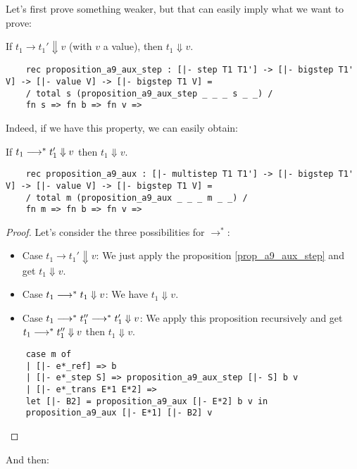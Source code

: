 Let's first prove something weaker, but that can easily imply what we want to
prove:

\begin{proposition}\label{prop_a9_aux_step}
  If $t_1 \longrightarrow t_1' \Downarrow v$ (with $v$ a value),
  then $t_1 \Downarrow v$.
  \begin{lstlisting}
    rec proposition_a9_aux_step : [|- step T1 T1'] -> [|- bigstep T1' V] -> [|- value V] -> [|- bigstep T1 V] =
    / total s (proposition_a9_aux_step _ _ _ s _ _) /
    fn s => fn b => fn v =>
  \end{lstlisting}
\end{proposition}

Indeed, if we have this property, we can easily obtain:

\begin{proposition}[A9-aux]\label{prop_a9_aux}
  If $t_1 \longrightarrow^* t_1' \Downarrow v$ then $t_1 \Downarrow v$.
  \begin{lstlisting}
    rec proposition_a9_aux : [|- multistep T1 T1'] -> [|- bigstep T1' V] -> [|- value V] -> [|- bigstep T1 V] =
    / total m (proposition_a9_aux _ _ _ m _ _) /
    fn m => fn b => fn v =>
  \end{lstlisting}
\end{proposition}
\begin{proof}
  Let's consider the three possibilities for $\rightarrow^*$:
  \begin{itemize}
  \item Case $t_1 \longrightarrow t_1' \Downarrow v$: We just apply the
    proposition \ref{prop_a9_aux_step} and get $t_1 \Downarrow v$.
  \item Case $t_1 \longrightarrow^* t_1 \Downarrow v$: We have
    $t_1 \Downarrow v$.
  \item Case $t_1 \longrightarrow^* t_1'' \longrightarrow^* t_1' \Downarrow v$:
    We apply this proposition recursively and get $t_1 \longrightarrow^* t_1''
    \Downarrow v$ then $t_1 \Downarrow v$.
  \end{itemize}
  \begin{lstlisting}
    case m of
    | [|- e*_ref] => b
    | [|- e*_step S] => proposition_a9_aux_step [|- S] b v
    | [|- e*_trans E*1 E*2] =>
    let [|- B2] = proposition_a9_aux [|- E*2] b v in
    proposition_a9_aux [|- E*1] [|- B2] v
  \end{lstlisting}
\end{proof}

And then:

